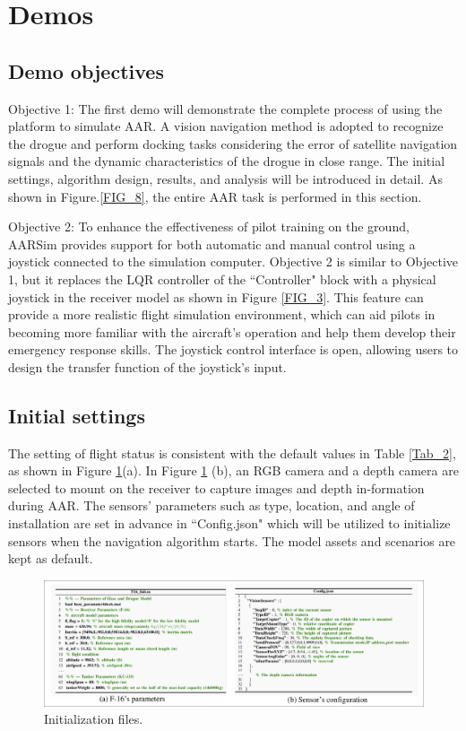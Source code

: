 \section{Demos  }
\label{sec5}
\subsection{Demo objectives}\label{sec5.1}
Objective 1: The first demo will demonstrate the complete process of using the platform to simulate AAR. A vision navigation method is adopted to recognize the drogue and perform docking tasks considering the error of satellite navigation signals and the dynamic characteristics of the drogue in close range. The initial settings, algorithm design, results, and analysis will be introduced in detail. As shown in Figure.\ref{FIG_8}, the entire AAR task is performed in this section. 

Objective 2: To enhance the effectiveness of pilot training on the ground, AARSim provides support for both automatic and manual control using a joystick connected to the simulation computer. Objective 2 is similar to Objective 1, but it replaces the LQR controller of the ``Controller" block with a physical joystick in the receiver model as shown in Figure \ref{FIG_3}. This feature can provide a more realistic flight simulation environment, which can aid pilots in becoming more familiar with the aircraft's operation and help them develop their emergency response skills. The joystick control interface is open, allowing users to design the transfer function of the joystick's input.

\subsection{Initial settings}\label{sec5.2}
The setting of flight status is consistent with the default values in Table \ref{Tab_2}, as shown in Figure \ref{FIG_14}(a). In Figure \ref{FIG_14} (b), an RGB camera and a depth camera are selected to mount on the receiver to capture images and depth in-formation during AAR. The sensors' parameters such as type, location, and angle of installation are set in advance in ``Config.json" which will be utilized to initialize sensors when the navigation algorithm starts. The model assets and scenarios are kept as default.

\begin{figure}[th]
	\centering
	\includegraphics[width=1\textwidth]{Figures/Figs_Ch5/Fig14.pdf}
	\caption{Initialization files.}\label{FIG_14}
\end{figure}


